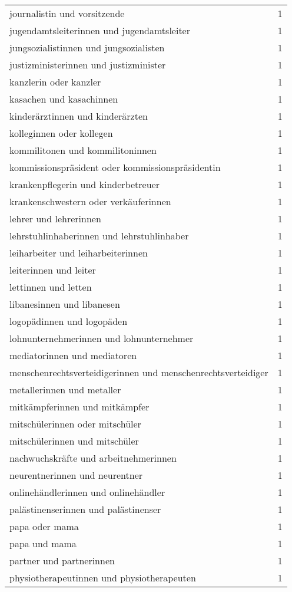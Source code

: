 \begin{tabular}{ll}
journalistin und vorsitzende & 1\\
jugendamtsleiterinnen und jugendamtsleiter & 1\\
jungsozialistinnen und jungsozialisten & 1\\
justizministerinnen und justizminister & 1\\
kanzlerin oder kanzler & 1\\
kasachen und kasachinnen & 1\\
kinderärztinnen und kinderärzten & 1\\
kolleginnen oder kollegen & 1\\
kommilitonen und kommilitoninnen & 1\\
kommissionspräsident oder kommissionspräsidentin & 1\\
krankenpflegerin und kinderbetreuer & 1\\
krankenschwestern oder verkäuferinnen & 1\\
lehrer und lehrerinnen & 1\\
lehrstuhlinhaberinnen und lehrstuhlinhaber & 1\\
leiharbeiter und leiharbeiterinnen & 1\\
leiterinnen und leiter & 1\\
lettinnen und letten & 1\\
libanesinnen und libanesen & 1\\
logopädinnen und logopäden & 1\\
lohnunternehmerinnen und lohnunternehmer & 1\\
mediatorinnen und mediatoren & 1\\
menschenrechtsverteidigerinnen und menschenrechtsverteidiger & 1\\
metallerinnen und metaller & 1\\
mitkämpferinnen und mitkämpfer & 1\\
mitschülerinnen oder mitschüler & 1\\
mitschülerinnen und mitschüler & 1\\
nachwuchskräfte und arbeitnehmerinnen & 1\\
neurentnerinnen und neurentner & 1\\
onlinehändlerinnen und onlinehändler & 1\\
palästinenserinnen und palästinenser & 1\\
papa oder mama & 1\\
papa und mama & 1\\
partner und partnerinnen & 1\\
physiotherapeutinnen und physiotherapeuten & 1\\

\end{tabular}
